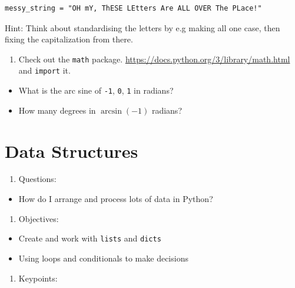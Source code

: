 \documentclass[]{book}
\providecommand{\tightlist}{%
  \setlength{\itemsep}{0pt}\setlength{\parskip}{0pt}}
\theoremstyle{definition}
\theoremstyle{definition}
\theoremstyle{definition}
\theoremstyle{remark}
\begin{document}
\begin{verbatim}
messy_string = "OH mY, ThESE LEtters Are ALL OVER The PLace!"
\end{verbatim}

Hint: Think about standardising the letters by e.g making all one case,
then fixing the capitalization from there.

\begin{enumerate}
\def\labelenumi{\arabic{enumi}.}
\setcounter{enumi}{4}
\tightlist
\item
  Check out the \texttt{math} package.
  \href{}{https://docs.python.org/3/library/math.html} and
  \texttt{import} it.
\end{enumerate}

\begin{itemize}
\tightlist
\item
  What is the arc sine of \texttt{-1}, \texttt{0}, \texttt{1} in
  radians?
\item
  How many degrees in \(\arcsin(-1)\) radians?
\end{itemize}

\hypertarget{data-structures}{%
\chapter{Data Structures}\label{data-structures}}

\begin{enumerate}
\def\labelenumi{\arabic{enumi}.}
\tightlist
\item
  Questions:
\end{enumerate}

\begin{itemize}
\tightlist
\item
  How do I arrange and process lots of data in Python?
\end{itemize}

\begin{enumerate}
\def\labelenumi{\arabic{enumi}.}
\setcounter{enumi}{1}
\tightlist
\item
  Objectives:
\end{enumerate}

\begin{itemize}
\tightlist
\item
  Create and work with \texttt{lists} and \texttt{dicts}
\item
  Using loops and conditionals to make decisions
\end{itemize}

\begin{enumerate}
\def\labelenumi{\arabic{enumi}.}
\setcounter{enumi}{2}
\tightlist
\item
  Keypoints:
\end{enumerate}
\end{document}

